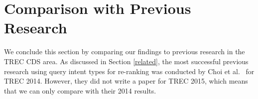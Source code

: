 %
%
%

\section{Comparison with Previous Research}
We conclude this section by comparing our findings to previous research in the TREC CDS area.
As discussed in Section \ref{related}, the most successful previous research using query intent types for re-ranking
was conducted by Choi et al.~\cite{choi} for TREC 2014. However, they did not write a paper for TREC 2015,
which means that we can only compare with their 2014 results.

